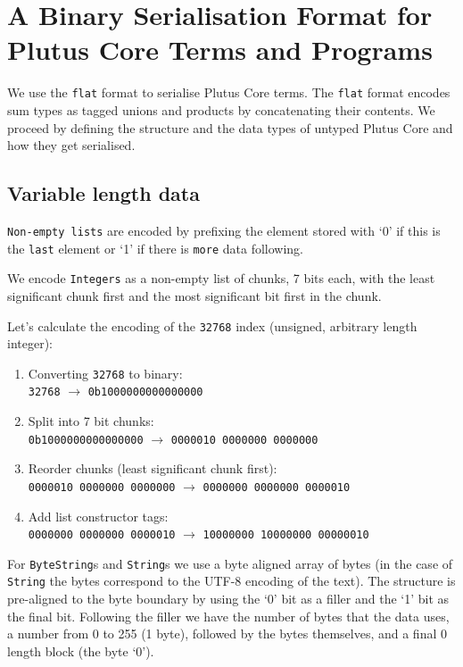 \section{A Binary Serialisation Format for Plutus Core Terms and Programs}
\label{appendix:serialisation}

\bigskip
\bigskip

We use the \texttt{flat} \citep{flat} format to serialise Plutus Core terms. The
\texttt{flat} format encodes sum types as tagged unions and products by
concatenating their contents. We proceed by defining the structure and the data
types of untyped Plutus Core and how they get serialised.

\subsection{Variable length data}

\texttt{Non-empty lists} are encoded by prefixing the element stored with `0'
if this is the \texttt{last} element or `1' if there is \texttt{more} data following.

\noindent We encode \texttt{Integers} as a non-empty list of chunks, 7 bits each,
with the least significant chunk first and the most significant bit first in the chunk.

\medskip
\noindent Let's calculate the encoding of the \texttt{32768} index (unsigned, arbitrary
length integer):
\begin{enumerate}
  \item Converting \texttt{32768} to binary: \\
    \verb|32768| $\rightarrow$ \verb|0b1000000000000000|
  \item Split into 7 bit chunks: \\
    \verb|0b1000000000000000| $\rightarrow$ \verb|0000010 0000000 0000000|
  \item Reorder chunks (least significant chunk first): \\
    \verb|0000010 0000000 0000000| $\rightarrow$ \verb|0000000 0000000 0000010|
  \item Add list constructor tags: \\
    \verb|0000000 0000000 0000010| $\rightarrow$ \verb|10000000 10000000 00000010|
\end{enumerate}

For \texttt{ByteString}s and \texttt{String}s we use a byte aligned array of
bytes (in the case of \texttt{String} the bytes correspond to the UTF-8 encoding
of the text). The structure is pre-aligned to the byte boundary by using the `0'
bit as a filler and the `1' bit as the final bit. Following the filler we have
the number of bytes that the data uses, a number from 0 to 255 (1 byte),
followed by the bytes themselves, and a final 0 length block (the byte `0').

